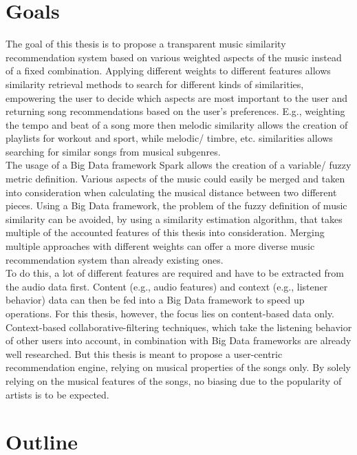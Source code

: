 \section{Goals}

The goal of this thesis is to propose a transparent music similarity recommendation system based on various weighted aspects of the music instead of a fixed combination. Applying different weights to different features allows similarity retrieval methods to search for different kinds of similarities, empowering the user to decide which aspects are most important to the user and returning song recommendations based on the user's preferences. E.g., weighting the tempo and beat of a song more then melodic similarity allows the creation of playlists for workout and sport, while melodic/ timbre, etc. similarities allows searching for similar songs from musical subgenres.\\ 
The usage of a Big Data framework Spark allows the creation of a variable/ fuzzy metric definition. Various aspects of the music could easily be merged and taken into consideration when calculating the musical distance between two different pieces. Using a Big Data framework, the problem of the fuzzy definition of music similarity can be avoided, by using a similarity estimation algorithm, that takes multiple of the accounted features of this thesis into consideration. Merging multiple approaches with different weights can offer a more diverse music recommendation system than already existing ones.\\ 
To do this, a lot of different features are required and have to be extracted from the audio data first. Content (e.g., audio features) and context (e.g., listener behavior) data can then be fed into a Big Data framework to speed up operations. For this thesis, however, the focus lies on content-based data only.\\ 
Context-based collaborative-filtering techniques, which take the listening behavior of other users into account, in combination with Big Data frameworks are already well researched. But this thesis is meant to propose a user-centric recommendation engine, relying on musical properties of the songs only. By solely relying on the musical features of the songs, no biasing due to the popularity of artists is to be expected.\\

\section{Outline}

